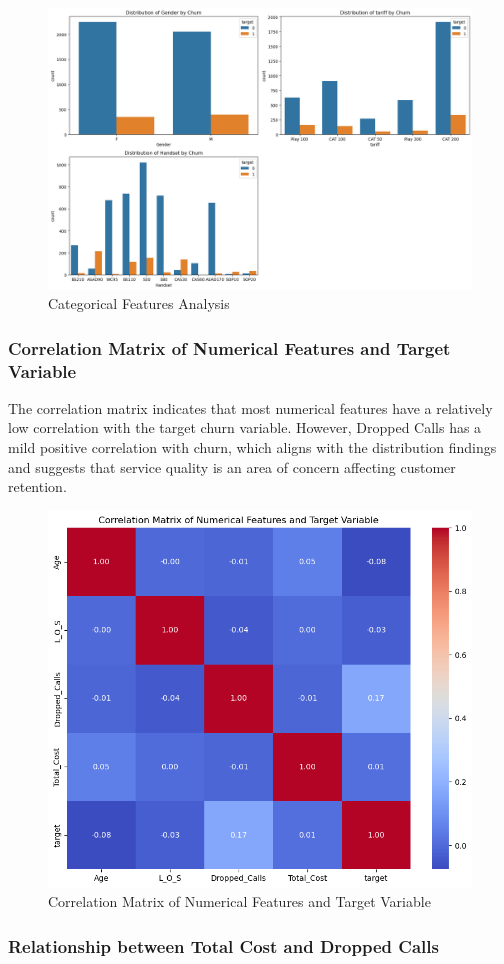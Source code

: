 \documentclass{article}
\begin{document}
\begin{figure}[h]
\centering
\includegraphics[width=0.8\linewidth]{Categorical Features Analysis.png}
\caption{Categorical Features Analysis}
\label{fig:distribution}
\end{figure}











\subsubsection{Correlation Matrix of Numerical Features and Target Variable}


The correlation matrix indicates that most numerical features have a relatively low correlation with the target churn variable. However, Dropped Calls has a mild positive correlation with churn, which aligns with the distribution findings and suggests that service quality is an area of concern affecting customer retention.

\begin{figure}[h]
\centering
\includegraphics[width=0.3\linewidth]{Correlation Matrix of Numerical Features and Target Variable.png}
\caption{Correlation Matrix of Numerical Features and Target Variable}
\label{fig:distribution}
\end{figure}


\subsubsection{Relationship between Total Cost and Dropped Calls}
\end{document}
